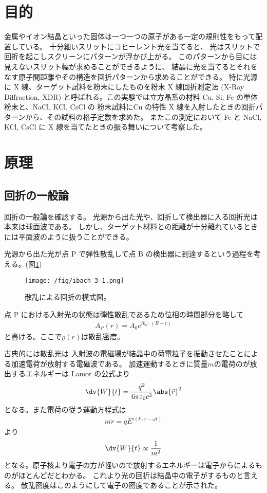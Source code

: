 \documentclass[11pt,dvipdfmx,a4paper]{jsarticle}
\begin{document}
\section{目的}
金属やイオン結晶といった固体は一つ一つの原子がある一定の規則性をもって配置している。
十分細いスリットにコヒーレント光を当てると、
光はスリットで回折を起こしスクリーンにパターンが浮かび上がる。
このパターンから目には見えないスリット幅が求めることができるように、
結晶に光を当てるとそれをなす原子間距離やその構造を回折パターンから求めることができる。
特に光源に X 線、ターゲット試料を粉末にしたものを粉末 X 線回折測定法 (X-Ray Diffraction, XDR)
と呼ばれる。この実験では立方晶系の材料 Cu, Si, Fe の単体粉末と、NaCl, KCl, CsCl の
粉末試料にCu の特性 X 線を入射したときの回折パターンから、その試料の格子定数を求めた。
またこの測定において Fe と NaCl, KCl, CsCl に X 線を当てたときの振る舞いについて考察した。

\section{原理}
\subsection{回折の一般論}
回折の一般論を確認する。
光源から出た光や、回折して検出器に入る回折光は本来は球面波である。
しかし、ターゲット材料との距離が十分離れているときには平面波のように扱うことができる。

光源から出た光が点 P で弾性散乱して点 B の検出器に到達するという過程を考える。(図\ref{ibach_fig3-1})
\begin{figure}[H]
	\centering
	\texttt{[image: /fig/ibach\_3-1.png]}
	\caption{散乱による回折の模式図。\cite{ibach-luth}}
	\label{ibach_fig3-1}
\end{figure}
点 P における入射光の状態は弾性散乱であるため位相の時間部分を略して
\begin{align}
	A_P(r) = A_0e^{ik_0\cdot(R+r)}
\end{align}
と書ける。ここで\(\rho(r)\)は散乱密度。

古典的には散乱光は
入射波の電磁場が結晶中の荷電粒子を振動させたことによる加速電荷が放射する電磁波である。
加速運動するときに質量\(m\)の電荷のが放出するエネルギーは Lamor の公式より
\begin{align}
	\dv{W}{t} = \frac{q^2}{6\pi\varepsilon_0c^3}\abs{\ddot{r}}^2
\end{align}
となる。また電荷の従う運動方程式は
\begin{align}
	m\ddot{r} = qE^{i(k\cdot r -\omega t)}
\end{align}
より
\begin{align}
	\dv{W}{t} \propto \frac{1}{m^2}
\end{align}
となる。原子核より電子の方が軽いので放射するエネルギーは電子からによるものがほとんどだとわかる。
これより光の回折は結晶中の電子がするものと言える。
散乱密度はこのようにして電子の密度であることが示された。
\end{document}
